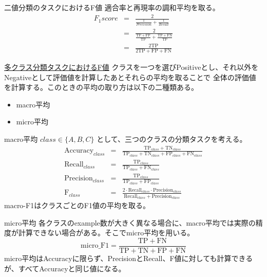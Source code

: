 \documentclass[leno,xcolor=dvipsnames]{beamer}
\begin{document}
  \begin{frame}{二値分類のタスクにおけるF値}
    適合率と再現率の調和平均を取る。
    \begin{eqnarray*}
      F_1score 
      &=& \frac{2}{\frac{1}{Precision} + \frac{1}{Recall}} \\
      &=& \frac{2}{\frac{\mathrm{TP} + \mathrm{FP}}{\mathrm{TP}} + \frac{\mathrm{TP} + \mathrm{FN}}{\mathrm{TP}}} \\
      &=& \frac{2\mathrm{TP}}{2\mathrm{TP} + \mathrm{FP} + \mathrm{FN}}
    \end{eqnarray*}
  \end{frame}

  \begin{frame}{\href{https://qiita.com/jyori112/items/110596b4f04e4e1a3c9b}{多クラス分類タスクにおけるF値}}
    クラスを一つを選びPositiveとし、それ以外をNegativeとして評価値を計算したあとそれらの平均を取ることで
    全体の評価値を計算する。このときの平均の取り方は以下の二種類ある。
    \begin{itemize}
      \item macro平均 
      \item micro平均 
    \end{itemize}
  \end{frame}

  \begin{frame}{macro平均}
    $class \in \{A, B, C\}$ として、三つのクラスの分類タスクを考える。
    \begin{eqnarray*}
      \mathrm{Accuracy}_{class} &=& \frac{\mathrm{TP}_{class} + \mathrm{TN}_{class}}{\mathrm{TP}_{class} + \mathrm{TN}_{class} + \mathrm{FP}_{class} + \mathrm{FN}_{class}} \\
      \mathrm{Recall}_{class} &=& \frac{\mathrm{TP}_{class}}{\mathrm{TP}_{class} + \mathrm{FN}_{class}} \\
      \mathrm{Precision}_{class} &=& \frac{\mathrm{TP}_{class}}{\mathrm{TP}_{class} + \mathrm{FP}_{class}} \\
      \mathrm{\mathrm{F}}_{class} &=& \frac{2 \cdot \mathrm{Recall}_{class} \cdot \mathrm{Precision}_{class}}{\mathrm{Recall}_{class} + \mathrm{Precision}_{class}}
    \end{eqnarray*}
    macro-F1はクラスごとのF1値の平均を取る。
  \end{frame}

  \begin{frame}{micro平均}
    各クラスのexample数が大きく異なる場合に、macro平均では実際の精度が計算できない場合がある。そこでmicro平均を用いる。
    \begin{equation*}
      \mathrm{micro\_F1} = \frac{\mathrm{TP} + \mathrm{FN}}{\mathrm{TP} + \mathrm{TN} + \mathrm{FP} + \mathrm{FN}}
    \end{equation*}
    micro平均はAccuracyに限らず、PrecisionとRecall、F値に対しても計算できるが、すべてAccuracyと同じ値になる。
  \end{frame}
\end{document}
